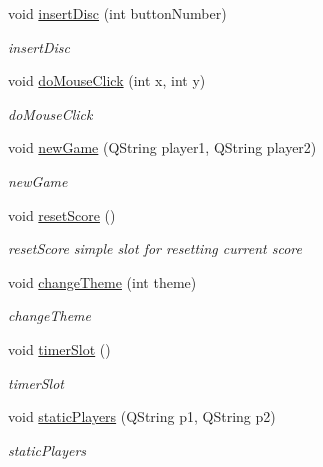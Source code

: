 \begin{DoxyCompactItemize}
\item 
void \mbox{\hyperlink{class_my_gl_item_aede114472dca4859706ee76de910e7bf}{insert\+Disc}} (int button\+Number)
\begin{DoxyCompactList}\small\item\em insert\+Disc \end{DoxyCompactList}\item 
void \mbox{\hyperlink{class_my_gl_item_a76e20888c579fb444dc071a43a301ced}{do\+Mouse\+Click}} (int x, int y)
\begin{DoxyCompactList}\small\item\em do\+Mouse\+Click \end{DoxyCompactList}\item 
void \mbox{\hyperlink{class_my_gl_item_ad6a0178cad3d36add83687a4f95ca668}{new\+Game}} (Q\+String player1, Q\+String player2)
\begin{DoxyCompactList}\small\item\em new\+Game \end{DoxyCompactList}\item 
\mbox{\label{class_my_gl_item_a16c0d5b7d71480dc2b09a678afcd1290}} 
void \mbox{\hyperlink{class_my_gl_item_a16c0d5b7d71480dc2b09a678afcd1290}{reset\+Score}} ()
\begin{DoxyCompactList}\small\item\em reset\+Score simple slot for resetting current score \end{DoxyCompactList}\item 
void \mbox{\hyperlink{class_my_gl_item_a613c4a856e605fffbcf0968f821e8823}{change\+Theme}} (int theme)
\begin{DoxyCompactList}\small\item\em change\+Theme \end{DoxyCompactList}\item 
void \mbox{\hyperlink{class_my_gl_item_adbaf81ef21b3437d37571fa897594550}{timer\+Slot}} ()
\begin{DoxyCompactList}\small\item\em timer\+Slot \end{DoxyCompactList}\item 
void \mbox{\hyperlink{class_my_gl_item_a169c0e508ce57d77a941feafd46245ed}{static\+Players}} (Q\+String p1, Q\+String p2)
\begin{DoxyCompactList}\small\item\em static\+Players \end{DoxyCompactList}\end{DoxyCompactItemize}
